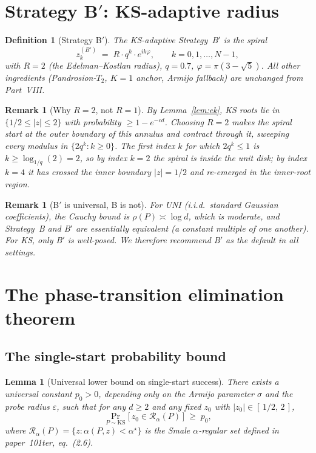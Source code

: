 \documentclass[11pt,a4paper]{article}
\newtheorem{lemma}[theorem]{Lemma}
\newtheorem{definition}[theorem]{Definition}
\newtheorem{remark}[theorem]{Remark}
\begin{document}
\section{Strategy B$'$: KS-adaptive radius}\label{sec:Bprime}

\begin{definition}[Strategy B$'$]\label{def:Bprime}
The KS-adaptive Strategy~B$'$ is the spiral
\begin{equation}\label{eq:strategy-Bprime}
z_k^{(B')} \;=\; R \cdot q^{k} \cdot e^{i k \varphi},
\qquad k = 0, 1, \dots, N - 1,
\end{equation}
with $R = 2$ (the Edelman--Kostlan radius), $q = 0.7$, $\varphi = \pi(3 - \sqrt{5})$. All other ingredients (Pandrosion-$T_2$, $K{=}1$ anchor, Armijo fallback) are unchanged from Part~VIII.
\end{definition}

\begin{remark}[Why $R = 2$, not $R = 1$]
By Lemma~\ref{lem:ek}, KS roots lie in $\{1/2 \le |z| \le 2\}$ with probability $\ge 1 - e^{-cd}$. Choosing $R = 2$ makes the spiral start at the outer boundary of this annulus and contract through it, sweeping every modulus in $\{2 q^k : k \ge 0\}$. The first index $k$ for which $2 q^k \le 1$ is $k \ge \log_{1/q}(2) = 2$, so by index $k = 2$ the spiral is inside the unit disk; by index $k = 4$ it has crossed the inner boundary $|z| = 1/2$ and re-emerged in the inner-root region.
\end{remark}

\begin{remark}[B$'$ is universal, B is not]
For UNI (i.i.d.\ standard Gaussian coefficients), the Cauchy bound is $\rho(P) \asymp \log d$, which is moderate, and Strategy~B and B$'$ are essentially equivalent (a constant multiple of one another). For KS, only B$'$ is well-posed. We therefore recommend B$'$ as the default in all settings.
\end{remark}

\section{The phase-transition elimination theorem}\label{sec:main-thm}

\subsection{The single-start probability bound}

\begin{lemma}[Universal lower bound on single-start success]\label{lem:single-start}
There exists a universal constant $p_0 > 0$, depending only on the Armijo parameter $\sigma$ and the probe radius $\varepsilon$, such that for any $d \ge 2$ and any fixed $z_0$ with $|z_0| \in [\,1/2,\, 2\,]$,
\begin{equation}\label{eq:single-start}
\Pr_{P \sim \mathrm{KS}}\!\bigl[\,z_0 \in \mathcal{R}_\alpha(P)\,\bigr] \;\ge\; p_0,
\end{equation}
where $\mathcal{R}_\alpha(P) = \{z : \alpha(P, z) < \alpha^\star\}$ is the Smale $\alpha$-regular set defined in paper~101ter, eq.~(2.6).
\end{lemma}
\end{document}
